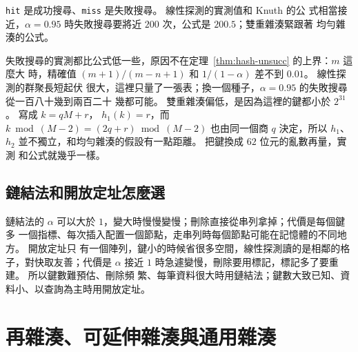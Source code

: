 
\texttt{hit} 是成功搜尋、\texttt{miss} 是失敗搜尋。 線性探測的實測值和 Knuth 的公
式相當接近，$\alpha = 0.95$ 時失敗搜尋要將近 $200$ 次，公式是 $200.5$；雙重雜湊緊跟著
均勻雜湊的公式。

失敗搜尋的實測都比公式低一些，原因不在定理~\ref{thm:hash-unsucc} 的上界：$m$ 這麼大
時，精確值 $(m+1)/(m-n+1)$ 和 $1/(1 - \alpha)$ 差不到 $0.01$。 線性探測的群聚長短起伏
很大，這裡只量了一張表；換一個種子，$\alpha = 0.95$ 的失敗搜尋從一百八十幾到兩百二十
幾都可能。 雙重雜湊偏低，是因為這裡的鍵都小於 $2^{31}$。 寫成 $k = qM + r$，
$h_1(k) = r$，而 $k \bmod (M - 2) = (2q + r) \bmod (M - 2)$ 也由同一個商 $q$ 決定，所以
$h_1$、$h_2$ 並不獨立，和均勻雜湊的假設有一點距離。 把鍵換成 $62$ 位元的亂數再量，實測
和公式就幾乎一樣。

\subsection{鏈結法和開放定址怎麼選}

鏈結法的 $\alpha$ 可以大於 $1$，變大時慢慢變慢；刪除直接從串列拿掉；代價是每個鍵多
一個指標、每次插入配置一個節點，走串列時每個節點可能在記憶體的不同地方。 開放定址只
有一個陣列，鍵小的時候省很多空間，線性探測讀的是相鄰的格子，對快取友善；代價是
$\alpha$ 接近 $1$ 時急遽變慢，刪除要用標記，標記多了要重建。 所以鍵數難預估、刪除頻
繁、每筆資料很大時用鏈結法；鍵數大致已知、資料小、以查詢為主時用開放定址。

\section{再雜湊、可延伸雜湊與通用雜湊}
\label{sec:hash-dynamic}


